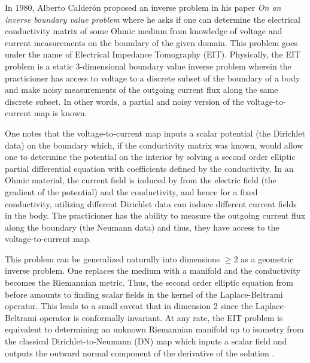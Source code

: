 In 1980, Alberto Calder\'on proposed an inverse problem in his paper \emph{On an inverse boundary value problem} \cite{calderon_inverse_2006} where he asks if one can determine the electrical conductivity matrix of some Ohmic medium from knowledge of voltage and current measurements on the boundary of the given domain. This problem goes under the name of Electrical Impedance Tomography (EIT). Physically, the EIT problem is a static 3-dimensional boundary value inverse problem wherein the practicioner has access to voltage to a discrete subset of the boundary of a body and make noisy measurements of the outgoing current flux along the same discrete subset. In other words, a partial and noisy version of the voltage-to-current map is known.

One notes that the voltage-to-current map inputs a scalar potential (the Dirichlet data) on the boundary which, if the conductivity matrix was known, would allow one to determine the potential on the interior by solving a second order elliptic partial differential equation with coefficients defined by the conductivity. In an Ohmic material, the current field is induced by from the electric field (the gradient of the potential) and the conductivity, and hence for a fixed conductivity, utilizing different Dirichlet data can induce different current fields in the body. The practicioner has the ability to measure the outgoing current flux along the boundary (the Neumann data) and thus, they have access to the voltage-to-current map.   

This problem can be generalized naturally into dimensions $\geq 2$ as a geometric inverse problem. One replaces the medium with a manifold and the conductivity becomes the Riemannian metric. Thus, the second order elliptic equation from before amounts to finding scalar fields in the kernel of the Laplace-Beltrami operator. This leads to a small caveat that in dimension 2 since the Laplace-Beltrami operator is conformally invariant. At any rate, the EIT problem is equivalent to determining an unknown Riemannian manifold up to isometry from the classical Dirichlet-to-Neumann (DN) map which inputs a scalar field and outputs the outward normal component of the derivative of the solution \cite{feldman_calderproblem_nodate, salo_calderon_nodate, uhlmann_inverse_2014}. 

